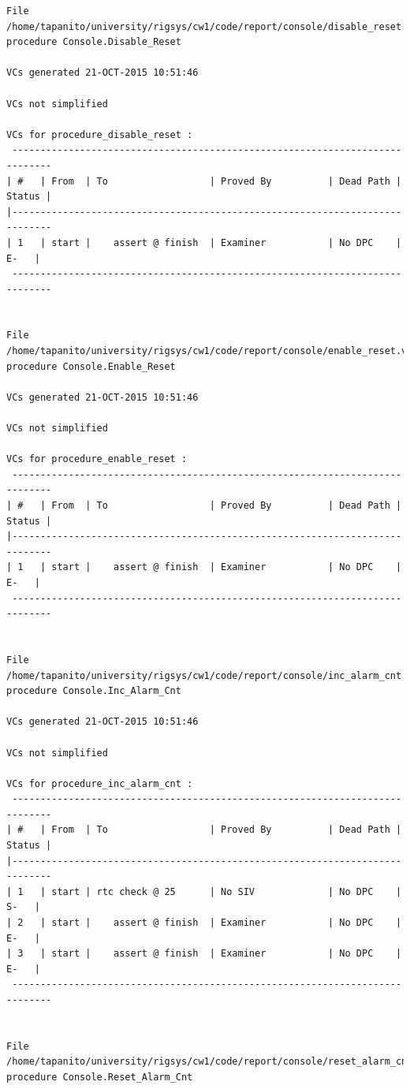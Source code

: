 \documentclass[a4paper, titlepage]{article}
\begin{document}
{\begin{lstlisting}
File /home/tapanito/university/rigsys/cw1/code/report/console/disable_reset.vcg
procedure Console.Disable_Reset

VCs generated 21-OCT-2015 10:51:46

VCs not simplified

VCs for procedure_disable_reset :
 -----------------------------------------------------------------------------
| #   | From  | To                  | Proved By          | Dead Path | Status |
|-----------------------------------------------------------------------------
| 1   | start |    assert @ finish  | Examiner           | No DPC    |   E-   |
 -----------------------------------------------------------------------------


File /home/tapanito/university/rigsys/cw1/code/report/console/enable_reset.vcg
procedure Console.Enable_Reset

VCs generated 21-OCT-2015 10:51:46

VCs not simplified

VCs for procedure_enable_reset :
 -----------------------------------------------------------------------------
| #   | From  | To                  | Proved By          | Dead Path | Status |
|-----------------------------------------------------------------------------
| 1   | start |    assert @ finish  | Examiner           | No DPC    |   E-   |
 -----------------------------------------------------------------------------


File /home/tapanito/university/rigsys/cw1/code/report/console/inc_alarm_cnt.vcg
procedure Console.Inc_Alarm_Cnt

VCs generated 21-OCT-2015 10:51:46

VCs not simplified

VCs for procedure_inc_alarm_cnt :
 -----------------------------------------------------------------------------
| #   | From  | To                  | Proved By          | Dead Path | Status |
|-----------------------------------------------------------------------------
| 1   | start | rtc check @ 25      | No SIV             | No DPC    |   S-   |
| 2   | start |    assert @ finish  | Examiner           | No DPC    |   E-   |
| 3   | start |    assert @ finish  | Examiner           | No DPC    |   E-   |
 -----------------------------------------------------------------------------


File /home/tapanito/university/rigsys/cw1/code/report/console/reset_alarm_cnt.vcg
procedure Console.Reset_Alarm_Cnt


\end{lstlisting}}
\end{document}

